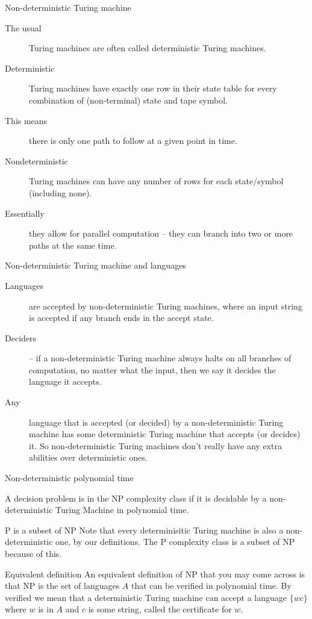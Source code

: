 \begin{frame}{Non-deterministic Turing machine}
  \begin{description}
    \item[The usual] Turing machines are often called deterministic Turing machines.
    \item[Deterministic] Turing machines have exactly one row in their state table for every combination of (non-terminal) state and tape symbol.
    \item[This means] there is only one path to follow at a given point in time.
    \item[Nondeterministic] Turing machines can have any number of rows for each state/symbol (including none).
    \item[Essentially] they allow for parallel computation -- they can branch into two or more paths at the same time.
  \end{description}
\end{frame}


\begin{frame}{Non-deterministic Turing machine and languages}
  \begin{description}
    \item[Languages] are accepted by non-deterministic Turing machines, where an input string is accepted if any branch ends in the accept state.
    \item[Deciders] -- if a non-deterministic Turing machine always halts on all branches of computation, no matter what the input, then we say it decides the language it accepts.
    \item[Any] language that is accepted (or decided) by a non-deterministic Turing machine has some deterministic Turing machine that accepts (or decides) it. So non-deterministic Turing machines don't really have any extra abilities over deterministic ones.
  \end{description}
\end{frame}


\begin{frame}{Non-deterministic polynomial time}
  \begin{definition}
    A decision problem is in the NP complexity class if it is decidable by a non-deterministic Turing Machine in polynomial time.
  \end{definition}
  
  \begin{alertblock}{P is a subset of NP}
    Note that every determinisitic Turing machine is also a non-deterministic one, by our definitions.
    The P complexity class is a subset of NP because of this.
  \end{alertblock}

  \begin{alertblock}{Equivalent definition}
    An equivalent definition of NP that you may come across is that NP is the set of languages $A$ that can be verified in polynomial time.
    By verified we mean that a deterministic Turing machine can accept a language $\{ wc \}$ where $w$ is in $A$ and $c$ is some string, called the certificate for $w$.
  \end{alertblock}

\end{frame}


